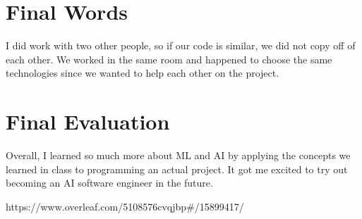 \documentclass[a4paper, 11pt]{article}
\begin{document}
\section*{Final Words}
I did work with two other people, so if our code is similar, we did not copy off of each other. We worked in the same room and happened to choose the same technologies since we wanted to help each other on the project.

\section*{Final Evaluation}
Overall, I learned so much more about ML and AI by applying the concepts we learned in class to programming an actual project. It got me excited to try out becoming an AI software engineer in the future.

\begin{thebibliography}{9}
https://www.overleaf.com/5108576cvqjbp#/15899417/
\end{thebibliography}
\end{document}
